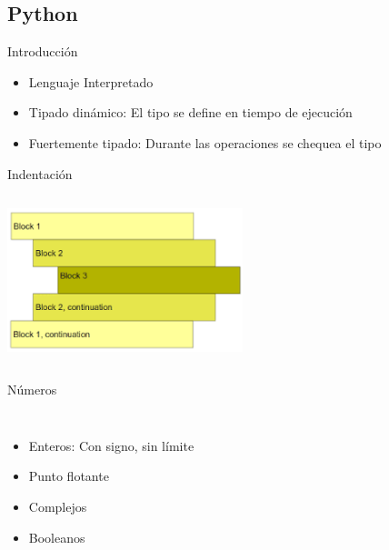 \subsection{Python}
 \begin{frame}{Introducción}
 \begin{itemize}
    \item{Lenguaje Interpretado}
    \item{Tipado dinámico: El tipo se define en tiempo de ejecución}
    \item{Fuertemente tipado: Durante las operaciones se chequea el tipo}
 \end{itemize}
    \vfill
 \end{frame}
 \begin{frame}{Indentación}
    \begin{columns}[onlytextwidth]
       \center\includegraphics[width=0.9\textwidth]{python/indentado}
       
    \end{columns}
    \vfill
 \end{frame}
 \begin{frame}{Números}
    \begin{columns}[onlytextwidth]
       \begin{itemize}
          \item{Enteros: Con signo, sin límite}
          \item{Punto flotante}
          \item{Complejos}
          \item{Booleanos}
       \end{itemize}
       
    \end{columns}
    \vfill
 \end{frame}
